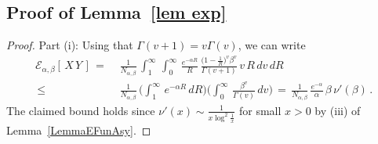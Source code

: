 \documentclass[10pt]{article}
\numberwithin{equation}{section}
\theoremstyle{definition}
\begin{document}
\subsection{Proof of Lemma~\ref{lem exp}}\label{Subsectionlem exp}

 \begin{proof} 
        \noindent Part (i): Using that $\Gamma(v+1)=v\Gamma(v)$, we can write
        \begin{align*}
\mathcal{E}_{\alpha,\beta}[\,X\,Y\,]
\,=\,&\,\frac{1  }{ N_{\alpha,\beta}  } \,\int_1^{\infty}\,\int_0^{\infty} \, \frac{e^{-\alpha R}}{R} \,  \frac{  \big(1-\frac{1}{R}\big)^v \beta^v }{  \Gamma(v+1)} \,v\,R\, dv \,dR   \\
\,\leq \,&\,\frac{1  }{ N_{\alpha,\beta}  } \,\bigg(\int_1^{\infty} \,e^{-\alpha R }\,dR\bigg)\bigg( \int_0^{\infty}\,\frac{\beta^v}{  \Gamma(v)} \,dv\bigg)  
\,=  \,\frac{1}{ N_{\alpha,\beta}}\,\frac{ e^{-\alpha  } }{ \alpha}\, \beta \,\nu'( \beta)   \,.
\end{align*}
The claimed bound  holds since $\nu'(x)\sim \frac{1}{x\log^2\frac{1}{x}}   $ for small $x>0$ by (iii) of Lemma~\ref{LemmaEFunAsy}. \vspace{.2cm}



\end{proof}
\end{document}
